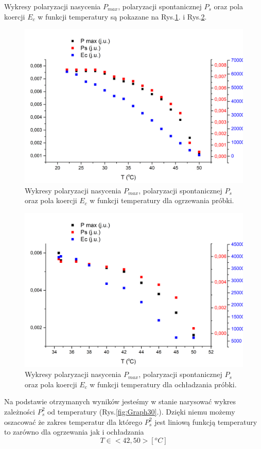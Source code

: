 \documentclass{article}
\begin{document}
Wykresy polaryzacji nasycenia $P_{max}$, polaryzacji spontanicznej $P_{s}$ oraz pola koercji $E_{c}$ w funkcji temperatury są pokazane na Rys.\ref{fig:Graph28}. i Rys.\ref{fig:Graph29}.

\begin{figure}[!h]
	\centering
	\includegraphics[width=0.8\linewidth]{Graph28.png}
	\caption{Wykresy polaryzacji nasycenia $P_{max}$, polaryzacji spontanicznej $P_{s}$ oraz pola koercji $E_{c}$ w funkcji temperatury dla ogrzewania próbki.}
	\label{fig:Graph28}
\end{figure}
\begin{figure}[!h]
	\centering
	\includegraphics[width=0.8\linewidth]{Graph29.png}
	\caption{Wykresy polaryzacji nasycenia $P_{max}$, polaryzacji spontanicznej $P_{s}$ oraz pola koercji $E_{c}$ w funkcji temperatury dla ochładzania próbki.}
	\label{fig:Graph29}
\end{figure}

Na podstawie otrzymanych wyników jesteśmy w stanie narysować wykres zależności $P_{s}^{2}$ od temperatury (Rys.\ref{fig:Graph30}.). Dzięki niemu możemy oszacować że zakres temperatur dla którego $P_{s}^{2}$ jest liniową funkcją temperatury to zarówno dla ogrzewania jak i ochładzania 
\begin{equation}
T\in <42 , 50 > [^{o}C]
\end{equation}
\end{document}
